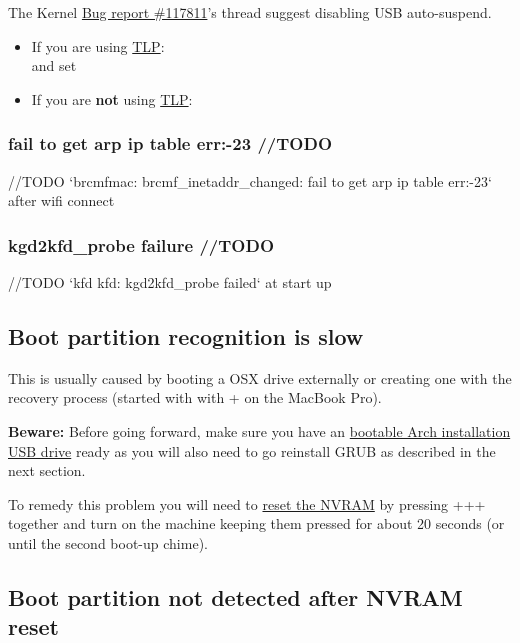 The Kernel \href{https://bugzilla.kernel.org/show_bug.cgi?id=117811}{Bug report \#117811}'s thread suggest disabling USB auto-suspend.

\begin{itemize}[noitemsep,topsep=0pt,leftmargin=*]
	\item If you are using \href{https://wiki.archlinux.org/index.php/TLP}{TLP}:\\
	 and set 
	\item If you are \textbf{not} using \href{https://wiki.archlinux.org/index.php/TLP}{TLP}:\\
\end{itemize}

\subsubsection{fail to get arp ip table err:-23  //TODO}

//TODO `brcmfmac: brcmf\_inetaddr\_changed: fail to get arp ip table err:-23` after wifi connect

\subsubsection{kgd2kfd\_probe failure //TODO}

//TODO `kfd kfd: kgd2kfd\_probe failed` at start up

\subsection{Boot partition recognition is slow}

This is usually caused by booting a OSX drive externally or creating one with the recovery process (started with with + on the MacBook Pro). 

\textbf{Beware:} Before going forward, make sure you have an \underline{bootable Arch installation USB drive} ready as you will also need to go reinstall GRUB as described in the next section.

To remedy this problem you will need to \href{https://support.apple.com/en-us/HT204063}{reset the NVRAM} by pressing +++ together and turn on the machine keeping them pressed for about 20 seconds (or until the second boot-up chime).

\subsection{Boot partition not detected after NVRAM reset}

